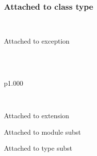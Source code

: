 \\
\label{Labels--class-c}\\
\label{Labels--class-type-cs}\label{Labels-class-type-cs}\begin{ocamlindent}\subsubsection{Attached to class type\label{Labels-class-type-cs--L8}}%
\end{ocamlindent}%
\\
\label{Labels--exception-E}\begin{ocamlindent}Attached to exception\end{ocamlindent}%
\medbreak
\label{Labels--type-x}\\
\label{Labels--extension-decl-X}\\
\begin{ocamltabular}{p{1.000\textwidth}}\label{Labels--extension-X}\\
\end{ocamltabular}%
\\
\begin{ocamlindent}Attached to extension\end{ocamlindent}%
\medbreak
\label{Labels--module-S}\begin{ocamlindent}Attached to module subst\end{ocamlindent}%
\medbreak
\label{Labels--type-s}\begin{ocamlindent}Attached to type subst\end{ocamlindent}%
